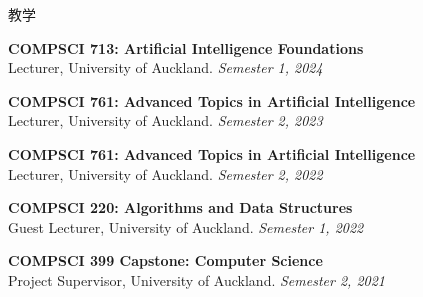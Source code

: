 \documentclass{resume} %
\begin{document}
\begin{rSection}{教学}
	\begin{rSubsection}{}{}{}{}
	\item {\bf COMPSCI 713: Artificial Intelligence Foundations}\\ Lecturer, University of Auckland. \hfill {\em Semester 1, 2024}
	\item {\bf COMPSCI 761: Advanced Topics in Artificial Intelligence}\\ Lecturer, University of Auckland. \hfill {\em Semester 2, 2023}
	\item {\bf COMPSCI 761: Advanced Topics in Artificial Intelligence}\\ Lecturer, University of Auckland. \hfill {\em Semester 2, 2022}
		\item {\bf COMPSCI 220: Algorithms and Data Structures}\\ Guest Lecturer, University of Auckland. \hfill {\em Semester 1, 2022} 
		\item {\bf COMPSCI 399 Capstone: Computer Science}\\ Project Supervisor, University of Auckland. \hfill {\em Semester 2, 2021}
	\end{rSubsection}
\end{rSection}

\end{document}
